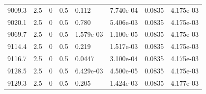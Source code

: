 \documentclass[preview]{standalone}
\begin{document}
{{{{{{{{{\begin{tabular}{L{1.2cm}C{1.2cm} C{0.3cm}C{0.5cm} C{1.4cm}C{1.4cm} C{1.4cm}C{1.4cm}}
  9009.3  &   2.5  & 0     & 0.5 &  0.112  & 7.740e-04  & 0.0835 &  4.175e-03   \\ 
  9020.1  &   2.5  & 0     & 0.5 &  0.780  & 5.406e-03  & 0.0835 &  4.175e-03   \\ 
  9069.7  &   2.5  & 0     & 0.5 &  1.579e-03  & 1.100e-05  & 0.0835 &  4.175e-03   \\ 
  9114.4  &   2.5  & 0     & 0.5 &  0.219  & 1.517e-03  & 0.0835 &  4.175e-03   \\ 
  9116.7  &   2.5  & 0     & 0.5 &  0.0447  & 3.100e-04  & 0.0835 &  4.175e-03   \\ 
  9128.5  &   2.5  & 0     & 0.5 &  6.429e-03  & 4.500e-05  & 0.0835 &  4.175e-03   \\ 
  9129.3  &   2.5  & 0     & 0.5 &  0.205  & 1.424e-03  & 0.0835 &  4.177e-03   \\ 
\hline 
\end{tabular} 

}}}}}}}}}
\end{document}
